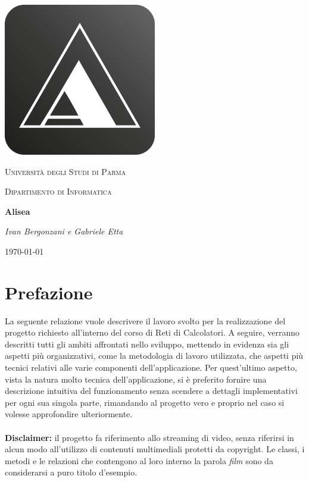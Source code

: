 \documentclass[a4]{book}
\begin{document}
\begin{titlepage}
\begin{titlepage}
	\centering
	\includegraphics[width=0.5\textwidth]{Alisea}\par\vspace{1cm}
	{\scshape\LARGE Università degli Studi di Parma \par}
	\vspace{1cm}
	{\scshape\Large Dipartimento di Informatica\par}
	\vspace{1.5cm}
	{\huge\bfseries Alisea\par}
	\vspace{2cm}
	{\Large\itshape Ivan Bergonzani e Gabriele Etta\par}
	
	\vfill
	

	{\large \today\par}
\end{titlepage}
\end{titlepage}


\tableofcontents

\chapter{Prefazione}
La seguente relazione vuole descrivere il lavoro svolto per la realizzazione del progetto richiesto all'interno del corso di Reti di Calcolatori. A seguire, verranno descritti tutti gli ambiti affrontati nello sviluppo, mettendo in evidenza sia gli aspetti più organizzativi, come la metodologia di lavoro utilizzata, che aspetti più tecnici relativi alle varie componenti dell'applicazione. Per quest'ultimo aspetto, vista la natura molto tecnica dell'applicazione, si è preferito fornire una descrizione intuitiva del funzionamento senza scendere a dettagli implementativi per ogni sua singola parte, rimandando al progetto vero e proprio nel caso si volesse approfondire ulteriormente. \\ \\
\textbf{Disclaimer: }il progetto fa riferimento allo streaming di video, senza riferirsi in alcun modo all'utilizzo di contenuti multimediali protetti da copyright. Le classi, i metodi e le relazioni che contengono al loro interno la parola \textit{film} sono da considerarsi a puro titolo d'esempio.
\end{document}
